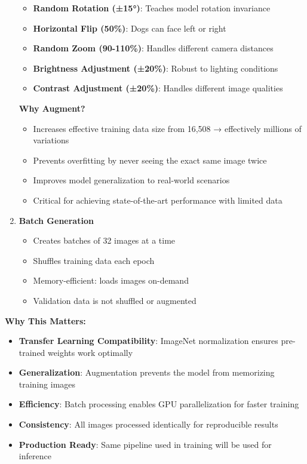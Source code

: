 \documentclass[
  letterpaper,
  DIV=11,
  numbers=noendperiod]{scrartcl}
\providecommand{\tightlist}{%
  \setlength{\itemsep}{0pt}\setlength{\parskip}{0pt}}
\begin{document}
\begin{enumerate}
  \begin{itemize}
  \tightlist
  \item
    \textbf{Random Rotation (±15°)}: Teaches model rotation invariance
  \item
    \textbf{Horizontal Flip (50\%)}: Dogs can face left or right
  \item
    \textbf{Random Zoom (90-110\%)}: Handles different camera distances
  \item
    \textbf{Brightness Adjustment (±20\%)}: Robust to lighting
    conditions
  \item
    \textbf{Contrast Adjustment (±20\%)}: Handles different image
    qualities
  \end{itemize}

  \textbf{Why Augment?}

  \begin{itemize}
  \tightlist
  \item
    Increases effective training data size from 16,508 → effectively
    millions of variations
  \item
    Prevents overfitting by never seeing the exact same image twice
  \item
    Improves model generalization to real-world scenarios
  \item
    Critical for achieving state-of-the-art performance with limited
    data
  \end{itemize}
\item
  \textbf{Batch Generation}

  \begin{itemize}
  \tightlist
  \item
    Creates batches of 32 images at a time
  \item
    Shuffles training data each epoch
  \item
    Memory-efficient: loads images on-demand
  \item
    Validation data is not shuffled or augmented
  \end{itemize}
\end{enumerate}

\textbf{Why This Matters:}

\begin{itemize}
\tightlist
\item
  \textbf{Transfer Learning Compatibility}: ImageNet normalization
  ensures pre-trained weights work optimally
\item
  \textbf{Generalization}: Augmentation prevents the model from
  memorizing training images
\item
  \textbf{Efficiency}: Batch processing enables GPU parallelization for
  faster training
\item
  \textbf{Consistency}: All images processed identically for
  reproducible results
\item
  \textbf{Production Ready}: Same pipeline used in training will be used
  for inference
\end{itemize}
\end{document}
